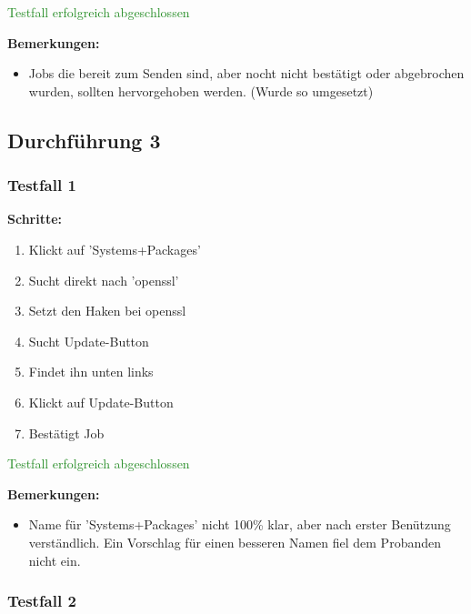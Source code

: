 {\textcolor{ForestGreen}{Testfall erfolgreich abgeschlossen}

\bigskip
\textbf{Bemerkungen:}

\begin{itemize}[noitemsep,nolistsep]
    \item Jobs die bereit zum Senden sind, aber nocht nicht bestätigt oder abgebrochen wurden, sollten hervorgehoben werden. (Wurde so umgesetzt)
\end{itemize}



\subsection*{Durchführung 3}



\subsubsection*{Testfall 1}

\textbf{Schritte:}

\begin{enumerate}
    \item Klickt auf 'Systems+Packages'
    \item Sucht direkt nach 'openssl'
    \item Setzt den Haken bei openssl
    \item Sucht Update-Button
    \item Findet ihn unten links
    \item Klickt auf Update-Button
    \item Bestätigt Job
\end{enumerate}

\textcolor{ForestGreen}{Testfall erfolgreich abgeschlossen}

\bigskip
\textbf{Bemerkungen:}

\begin{itemize}[noitemsep,nolistsep]
    \item Name für 'Systems+Packages' nicht 100\% klar, aber nach erster Benützung verständlich. Ein Vorschlag für einen besseren Namen fiel dem Probanden nicht ein.
\end{itemize}


\subsubsection*{Testfall 2}

}
